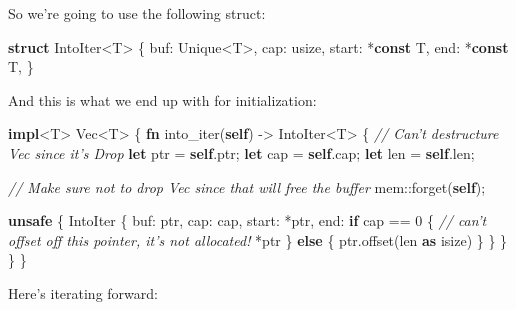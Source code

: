 \documentclass[a4paper,]{book}
\newenvironment{Shaded}{\begin{snugshade}}{\end{snugshade}}
\newcommand{\KeywordTok}[1]{\textcolor[rgb]{0.13,0.29,0.53}{\textbf{{#1}}}}
\newcommand{\DataTypeTok}[1]{\textcolor[rgb]{0.13,0.29,0.53}{{#1}}}
\newcommand{\DecValTok}[1]{\textcolor[rgb]{0.00,0.00,0.81}{{#1}}}
\newcommand{\CommentTok}[1]{\textcolor[rgb]{0.56,0.35,0.01}{\textit{{#1}}}}
\newcommand{\NormalTok}[1]{{#1}}
\begin{document}
So we're going to use the following struct:

\begin{Shaded}
\begin{Highlighting}[]
\KeywordTok{struct} \NormalTok{IntoIter<T> \{}
    \NormalTok{buf: Unique<T>,}
    \NormalTok{cap: }\DataTypeTok{usize}\NormalTok{,}
    \NormalTok{start: *}\KeywordTok{const} \NormalTok{T,}
    \NormalTok{end: *}\KeywordTok{const} \NormalTok{T,}
\NormalTok{\}}
\end{Highlighting}
\end{Shaded}

And this is what we end up with for initialization:

\begin{Shaded}
\begin{Highlighting}[]
\KeywordTok{impl}\NormalTok{<T> }\DataTypeTok{Vec}\NormalTok{<T> \{}
    \KeywordTok{fn} \NormalTok{into_iter(}\KeywordTok{self}\NormalTok{) -> IntoIter<T> \{}
        \CommentTok{// Can't destructure Vec since it's Drop}
        \KeywordTok{let} \NormalTok{ptr = }\KeywordTok{self}\NormalTok{.ptr;}
        \KeywordTok{let} \NormalTok{cap = }\KeywordTok{self}\NormalTok{.cap;}
        \KeywordTok{let} \NormalTok{len = }\KeywordTok{self}\NormalTok{.len;}

        \CommentTok{// Make sure not to drop Vec since that will free the buffer}
        \NormalTok{mem::forget(}\KeywordTok{self}\NormalTok{);}

        \KeywordTok{unsafe} \NormalTok{\{}
            \NormalTok{IntoIter \{}
                \NormalTok{buf: ptr,}
                \NormalTok{cap: cap,}
                \NormalTok{start: *ptr,}
                \NormalTok{end: }\KeywordTok{if} \NormalTok{cap == }\DecValTok{0} \NormalTok{\{}
                    \CommentTok{// can't offset off this pointer, it's not allocated!}
                    \NormalTok{*ptr}
                \NormalTok{\} }\KeywordTok{else} \NormalTok{\{}
                    \NormalTok{ptr.offset(len }\KeywordTok{as} \DataTypeTok{isize}\NormalTok{)}
                \NormalTok{\}}
            \NormalTok{\}}
        \NormalTok{\}}
    \NormalTok{\}}
\NormalTok{\}}
\end{Highlighting}
\end{Shaded}

Here's iterating forward:
\end{document}
